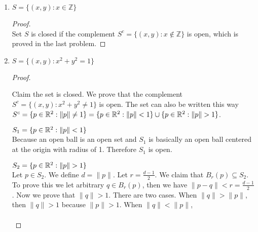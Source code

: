 \documentclass[11pt]{article}
\begin{document}
\begin{enumerate}
  \item $S = \{ (x,y): x\in \mathbb{Z}\}$
  \begin{proof}
    $ $ \\
    Set $S$ is closed if the complement $S^c = \{ (x,y): x\not\in \mathbb{Z}\}$ is open, which is proved in the last problem.
  \end{proof}

  \item  $S = \{ (x,y): x^2 + y^2 = 1\}$
  \begin{proof}
    $ $\\
    \begin{center}
    \end{center}
    Claim the set is closed. We prove that the complement $S^c = \{ (x,y): x^2 + y^2 \neq 1\}$ is open. The set can also be written this way $S^c = \{ p\in \mathbb{R}^2: \|p\| \neq 1\} = \{ p\in \mathbb{R}^2: \|p\| < 1\}\cup \{ p\in \mathbb{R}^2: \|p\| > 1\}$.
    \begin{case}
      $S_1  = \{ p\in \mathbb{R}^2: \|p\| < 1\}$ \\
      Because an open ball is an open set and $S_1$ is basically an open ball centered at the origin with radius of 1. Therefore $S_1$ is open.
    \end{case}
    \begin{case}
      $S_2  = \{ p\in \mathbb{R}^2: \|p\| > 1\}$ \\
      Let $p\in S_2$. We define $d = \|p \|$. Let $r=\frac{d-1}{2}$. We claim that $B_r(p)\subseteq S_2$. To prove this we let arbitrary $q\in B_r(p)$, then we have $\|p-q\| < r = \frac{d-1}{2}$. Now we prove that $\|q\| > 1$. There are two cases. When $\|q\| > \|p\|$, then $\|q\| > 1$ because $\|p\| > 1$. When $\|q\| < \|p\|$,
      \begin{align*}

\end{align*}
\end{case}
\end{proof}
\end{enumerate}
\end{document}
